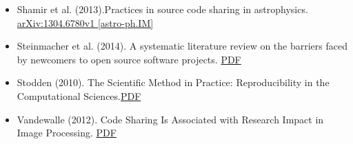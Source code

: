 \documentclass{article}
\begin{document}
\begin{itemize}
\item Shamir et al. (2013).Practices in source code sharing in astrophysics. \href{https://arxiv.org/abs/1304.6780}{arXiv:1304.6780v1 [astro-ph.IM]}


\item Steinmacher et al. (2014). A systematic literature review on the barriers faced by newcomers to open source software projects. \href{http://igor.pro.br/publica/papers/IST_SysReview_PrePrint.pdf}{PDF}


\item Stodden (2010). The Scientific Method in Practice: Reproducibility in the Computational Sciences.\href{http://datascienceassn.org/sites/default/files/The%20Scientific%20Method%20in%20Practice%20-%20Reproducibility%20in%20the%20Computational%20Sciences.pdf}{PDF}


\item Vandewalle (2012). Code Sharing Is Associated with Research Impact in Image Processing. \href{https://infoscience.epfl.ch/record/206184/files/Vandewalle12.pdf}{PDF}


\end{itemize}
\end{document}
